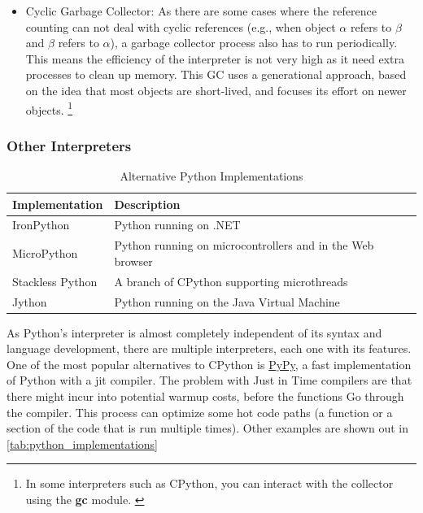 \begin{enumerate}
\begin{enumerate}
\begin{itemize}
            \item Cyclic Garbage Collector: As there are some cases where the reference counting can not deal with cyclic references (e.g., when object $\alpha$ refers to $\beta$ and $\beta$ refers to $\alpha$), a garbage collector process also has to run periodically. This means the efficiency of the interpreter is not very high as it need extra processes to clean up memory. This \gls{GC} uses a generational approach, based on the idea that most objects are short-lived, and focuses its effort on newer objects. \footnote{In some interpreters such as \gls{CPython}, you can interact with the collector using the \textbf{gc} module. \cite{python-gc} } 
        \end{itemize}
    \end{enumerate}
\end{enumerate}





\subsubsection{Other Interpreters}

\begin{table}[h]
    \centering
    \caption{Alternative Python Implementations}
    \label{tab:python_implementations}
    \begin{tabular}{ll}
        \toprule
        \textbf{Implementation} & \textbf{Description} \\
        \midrule
        IronPython & Python running on .NET \\
        MicroPython & Python running on microcontrollers and in the Web browser \\
        Stackless Python & A branch of CPython supporting microthreads \\
        Jython & Python running on the Java Virtual Machine \\
        \bottomrule
    \end{tabular}
\end{table}

As Python's interpreter is almost completely independent of its syntax and language development, there are multiple interpreters, each one with its features. One of the most popular alternatives to \gls{CPython} is \href{https://pypy.org/}{PyPy}, a fast implementation of Python with a \gls{jit} compiler. The problem with Just in Time compilers are that there might incur into potential warmup costs, before the functions Go through the compiler. This process can optimize some hot code paths (a function or a section of the code that is run multiple times). Other examples are shown out in \autoref{tab:python_implementations}



